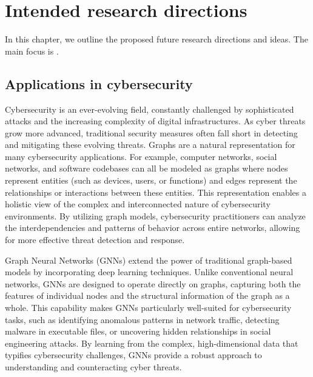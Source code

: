 \chapter{Intended research directions}
\label{chap:future}

In this chapter, we outline the proposed future research directions and ideas. The main focus is .


\section{Applications in cybersecurity}

Cybersecurity is an ever-evolving field, constantly challenged by sophisticated attacks and the increasing complexity of digital infrastructures. As cyber threats grow more advanced, traditional security measures often fall short in detecting and mitigating these evolving threats. Graphs are a natural representation for many cybersecurity applications. For example, computer networks, social networks, and software codebases can all be modeled as graphs where nodes represent entities (such as devices, users, or functions) and edges represent the relationships or interactions between these entities. This representation enables a holistic view of the complex and interconnected nature of cybersecurity environments. By utilizing graph models, cybersecurity practitioners can analyze the interdependencies and patterns of behavior across entire networks, allowing for more effective threat detection and response.

Graph Neural Networks (GNNs) extend the power of traditional graph-based models by incorporating deep learning techniques. Unlike conventional neural networks, GNNs are designed to operate directly on graphs, capturing both the features of individual nodes and the structural information of the graph as a whole. This capability makes GNNs particularly well-suited for cybersecurity tasks, such as identifying anomalous patterns in network traffic, detecting malware in executable files, or uncovering hidden relationships in social engineering attacks. By learning from the complex, high-dimensional data that typifies cybersecurity challenges, GNNs provide a robust approach to understanding and counteracting cyber threats.

